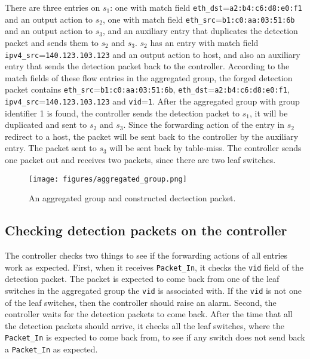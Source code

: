 There are three entries on $s_1$: one with match field \texttt{eth\_dst}=\texttt{a2:b4:c6:d8:e0:f1} and an output action to $s_2$, one with match field \texttt{eth\_src}=\texttt{b1:c0:aa:03:51:6b} and an output action to $s_3$, and an auxiliary entry that duplicates the detection packet and sends them to $s_2$ and $s_3$. $s_2$ has an entry with match field \texttt{ipv4\_src}=\texttt{140.123.103.123} and an output action to host, and also an auxiliary entry that sends the detection packet back to the controller. According to the match fields of these flow entries in the aggregated group, the forged detection packet contains \texttt{eth\_src}=\texttt{b1:c0:aa:03:51:6b}, \texttt{eth\_dst}=\texttt{a2:b4:c6:d8:e0:f1}, \texttt{ipv4\_src}=\texttt{140.123.103.123} and \texttt{vid}=\texttt{1}. After the aggregated group with group identifier 1 is found, the controller sends the detection packet to $s_1$, it will be duplicated and sent to $s_2$ and $s_3$. Since the forwarding action of the entry in $s_2$ redirect to a host, the packet will be sent back to the controller by the auxiliary entry. The packet sent to $s_3$ will be sent back by table-miss. The controller sends one packet out and receives two packets, since there are two leaf switches.

\begin{figure}[H]
\begin{center}
\texttt{[image: figures/aggregated\_group.png]}
\end{center}
\caption{An aggregated group and constructed dectection packet.}
\label{aggregated_group}
\end{figure}

\subsection{Checking detection packets on the controller}
The controller checks two things to see if the forwarding actions of all entries work as expected. First, when it receives \texttt{Packet\_In}, it checks the \texttt{vid} field of the detection packet. The packet is expected to come back from one of the leaf switches in the aggregated group the \texttt{vid} is associated with. If the \texttt{vid} is not one of the leaf switches, then the controller should raise an alarm. Second, the controller waits for the detection packets to come back. After the time that all the detection packets should arrive, it checks all the leaf switches, where the \texttt{Packet\_In} is expected to come back from, to see if any switch does not send back a \texttt{Packet\_In} as expected. 

